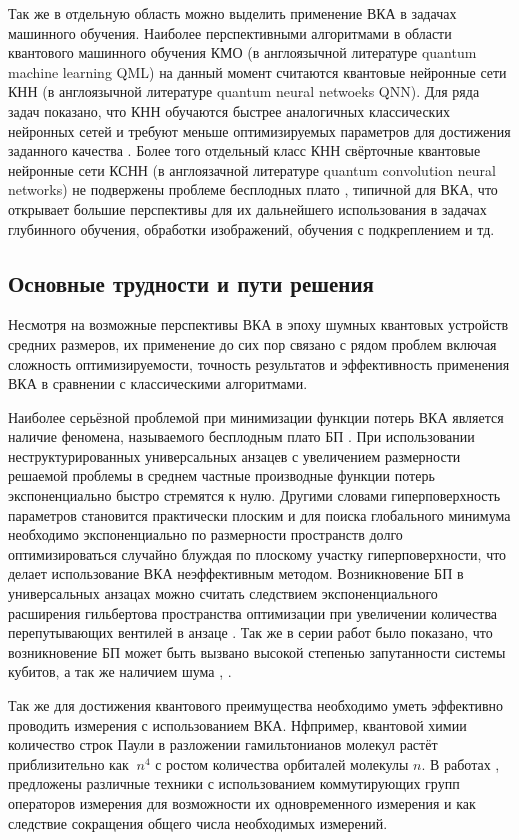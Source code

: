 \documentclass[14pt]{extarticle}
\begin{document}
\qquad Так же в отдельную область можно выделить применение ВКА в задачах машинного обучения. Наиболее перспективными алгоритмами в области квантового машинного обучения КМО (в англоязычной литературе quantum machine learning QML) на данный момент считаются квантовые нейронные сети КНН (в англоязычной литературе quantum neural netwoeks QNN). Для ряда задач показано, что КНН обучаются быстрее аналогичных классических нейронных сетей и требуют меньше оптимизируемых параметров для достижения заданного качества \cite{Abbas_2021}. Более того отдельный класс КНН свёрточные квантовые нейронные сети КСНН (в англоязачной литературе quantum convolution neural networks) не подвержены проблеме бесплодных плато \cite{QCNN}, типичной для ВКА, что открывает большие перспективы для их дальнейшего использования в задачах глубинного обучения, обработки изображений, обучения с подкреплением и тд.


\subsection{Основные трудности и пути решения}

\qquad Несмотря на возможные перспективы ВКА в эпоху шумных квантовых устройств средних размеров, их применение до сих пор связано с рядом проблем включая сложность оптимизируемости, точность результатов и эффективность применения ВКА в сравнении с классическими алгоритмами.

\qquad Наиболее серьёзной проблемой при минимизации функции потерь ВКА является наличие феномена, называемого бесплодным плато БП \cite{McClean_2018}. При использовании неструктурированных универсальных анзацев с увеличением размерности решаемой проблемы в среднем частные производные функции потерь экспоненциально быстро стремятся к нулю. Другими словами гиперповерхность параметров становится практически плоским и для поиска глобального минимума необходимо экспоненциально по размерности пространств долго оптимизироваться случайно блуждая по плоскому участку гиперповерхности, что делает использование ВКА неэффективным методом. Возникновение БП в универсальных анзацах можно считать следствием экспоненциального расширения гильбертова пространства оптимизации при увеличении количества перепутывающих вентилей в анзаце \cite{Holmes_2022}. Так же в серии работ было показано, что возникновение БП может быть вызвано высокой степенью запутанности системы кубитов, а так же наличием шума \cite{entangled_barren_plateaus}, \cite{noise_barren_plateaus}.

\qquad Так же для достижения квантового преимущества необходимо уметь эффективно проводить измерения с использованием ВКА. Нфпример, квантовой химии количество строк Паули в разложении гамильтонианов молекул растёт приблизительно как $~n^{4}$ с ростом количества орбиталей молекулы $n$. В работах \cite{Huggins_2021}, \cite{Yen_2021} предложены различные техники с использованием коммутирующих групп операторов измерения для возможности их одновременного измерения и как следствие сокращения общего числа необходимых измерений. 
\end{document}
